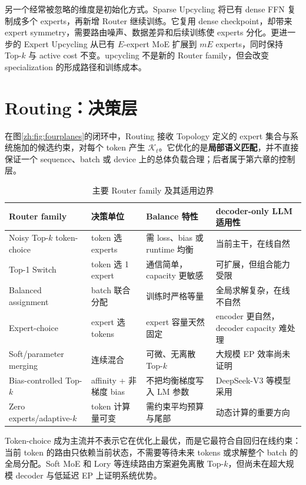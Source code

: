 \documentclass[10pt,a4paper,fontset=none]{ctexart}
\newcommand{\term}[1]{\textbf{#1}}
\begin{document}
另一个经常被忽略的维度是初始化方式。Sparse Upcycling 将已有 dense FFN 复制成多个 experts，再新增 Router 继续训练\cite{zh:komatsuzaki2022upcycling}。它复用 dense checkpoint，却带来 expert symmetry，需要路由噪声、数据差异和后续训练使 experts 分化。更进一步的 Expert Upcycling 从已有 $E$-expert MoE 扩展到 $mE$ experts，同时保持 Top-$k$ 与 active cost 不变\cite{zh:expertUpcycling2026}。upcycling 不是新的 Router family，但会改变 specialization 的形成路径和训练成本。

\section{Routing：决策层}

在图\ref{zh:fig:fourplanes}的闭环中，Routing 接收 Topology 定义的 expert 集合与系统施加的候选约束，对每个 token 产生 $\mathcal{K}_t$。它优化的是\term{局部语义匹配}，并不直接保证一个 sequence、batch 或 device 上的总体负载合理；后者属于第六章的控制层。

\begin{table}[htbp]
\centering
\caption{主要 Router family 及其适用边界}
\label{zh:tab:router}
\small
\begin{tabularx}{\textwidth}{p{}p{}Y Y}
\toprule
Router family & 决策单位 & Balance 特性 & decoder-only LLM 适用性 \\
\midrule
Noisy Top-$k$ token-choice & token 选 experts & 需 loss、bias 或 runtime 均衡 & 当前主干，在线自然 \\
Top-1 Switch & token 选 1 expert & 通信简单，capacity 更敏感 & 可扩展，但组合能力受限 \\
Balanced assignment & batch 联合分配 & 训练时严格等量 & 全局求解复杂，在线不自然 \\
Expert-choice & expert 选 tokens & expert 容量天然固定 & encoder 更自然，decoder capacity 难处理 \\
Soft/parameter merging & 连续混合 & 可微、无离散 Top-$k$ & 大规模 EP 效率尚未证明 \\
Bias-controlled Top-$k$ & affinity + 非梯度 bias & 不把均衡梯度写入 LM 参数 & DeepSeek-V3 等模型采用 \\
Zero experts/adaptive-$k$ & token 计算量可变 & 需约束平均预算与尾部 & 动态计算的重要方向 \\
\bottomrule
\end{tabularx}
\end{table}

Token-choice 成为主流并不表示它在优化上最优，而是它最符合自回归在线约束：当前 token 的路由只依赖当前状态，不需要等待未来 tokens 或求解整个 batch 的全局分配。Soft MoE 和 Lory 等连续路由方案避免离散 Top-$k$，但尚未在超大规模 decoder 与低延迟 EP 上证明系统优势\cite{zh:puigcerver2023softmoe,zh:zhong2024lory}。
\end{document}
